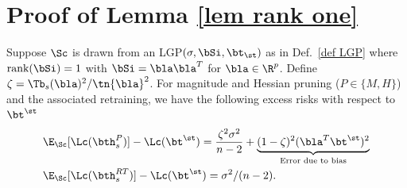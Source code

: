 \section{Proof of Lemma \ref{lem rank one}}\label{SM lem proof}
 
\begin{lemma} Suppose $\Sc$ is drawn from an LGP$(\sigma,\bSi,\bt_\st)$ as in Def.~\ref{def LGP} where $\text{rank}(\bSi)=1$ with $\bSi=\bla\bla^T$ for $\bla\in\R^p$. Define $\zeta=\Tb_s(\bla)^2/\tn{\bla}^2$. For magnitude and Hessian pruning ($P\in\{M,H\}$) and the associated retraining, we have the following excess risks with respect to $\bt^\st$%
\begin{align}%
&\E_{\Sc}[\Lc(\bth_s^P)]-\Lc(\bt^\st)={\frac{\zeta^2\sigma^2}{n-2}}+\underbrace{(1-\zeta)^2(\bla^T\bt^\st)^2}_{\text{Error due to bias}}\\
&\E_{\Sc}[\Lc(\bth_s^{RT})]-\Lc(\bt^\st)={\sigma^2}/({n-2}).
\end{align}
\end{lemma}
